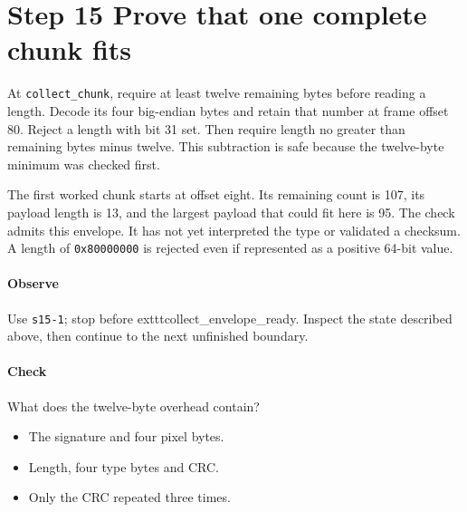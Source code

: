 \section{Step 15 Prove that one complete chunk fits}\label{png-collect-s15}
At \texttt{collect\_chunk}, require at least twelve remaining bytes before reading a length. Decode its four big-endian bytes and retain that number at frame offset 80. Reject a length with bit 31 set. Then require length no greater than remaining bytes minus twelve. This subtraction is safe because the twelve-byte minimum was checked first.

The first worked chunk starts at offset eight. Its remaining count is 107, its payload length is 13, and the largest payload that could fit here is 95. The check admits this envelope. It has not yet interpreted the type or validated a checksum. A length of \texttt{0x80000000} is rejected even if represented as a positive 64-bit value.

\paragraph{Observe} Use \texttt{s15-1}; stop before 	exttt{collect\_envelope\_ready}. Inspect the state described above, then continue to the next unfinished boundary.

\paragraph{Check} What does the twelve-byte overhead contain?
\begin{itemize}
\item[A.] The signature and four pixel bytes.
\item[B.] Length, four type bytes and CRC.
\item[C.] Only the CRC repeated three times.
\end{itemize}
